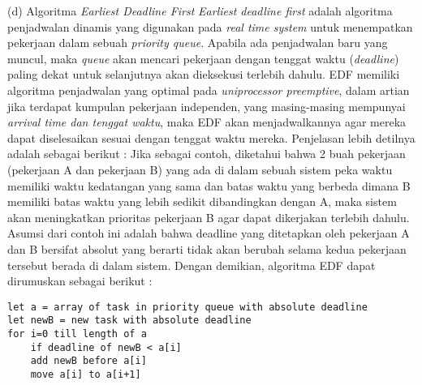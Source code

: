 \documentclass[a4paper,twoside]{article}
\begin{document}
\begin{enumerate}
		(d) Algoritma {\it Earliest Deadline First}\newline
		{\it Earliest deadline first} adalah algoritma penjadwalan dinamis yang digunakan pada {\it real time system} untuk menempatkan pekerjaan dalam sebuah {\it priority queue}. Apabila ada penjadwalan baru yang muncul, maka {\it queue} akan mencari pekerjaan dengan tenggat waktu ({\it deadline}) paling dekat untuk selanjutnya akan dieksekusi terlebih dahulu. \newline
		EDF memiliki algoritma penjadwalan yang optimal pada {\it uniprocessor preemptive}, dalam artian jika terdapat kumpulan pekerjaan independen, yang masing-masing mempunyai {\it arrival time dan tenggat waktu}, maka EDF akan menjadwalkannya agar mereka dapat diselesaikan sesuai dengan tenggat waktu mereka. Penjelasan lebih detilnya adalah sebagai berikut :\newline
		Jika sebagai contoh, diketahui bahwa 2 buah pekerjaan (pekerjaan A dan pekerjaan B) yang ada di dalam sebuah sistem peka waktu memiliki waktu kedatangan yang sama dan batas waktu yang berbeda dimana B memiliki batas waktu yang lebih sedikit dibandingkan dengan A, maka sistem akan meningkatkan prioritas pekerjaan B agar dapat dikerjakan terlebih dahulu. Asumsi dari contoh ini adalah bahwa deadline yang ditetapkan oleh pekerjaan A dan B bersifat absolut yang berarti tidak akan berubah selama kedua pekerjaan tersebut berada di dalam sistem.\newline
		Dengan demikian, algoritma EDF dapat dirumuskan sebagai berikut :\newline
		\begin{lstlisting}
let a = array of task in priority queue with absolute deadline
let newB = new task with absolute deadline
for i=0 till length of a
    if deadline of newB < a[i]
    add newB before a[i]
    move a[i] to a[i+1] 
		\end{lstlisting}
		
		\newpage
		

\end{enumerate}
\end{document}

